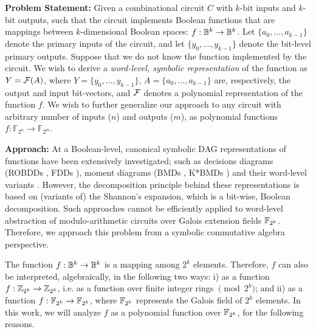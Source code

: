 {\bf Problem Statement:} Given a combinational circuit $C$ with
$k$-bit inputs and $k$-bit outputs, such that the circuit implements 
Boolean functions that are mappings between $k$-dimensional Boolean
spaces: $f: {\mathbb{B}}^k \rightarrow {\mathbb{B}}^k$. Let $\{a_0, \dots, a_{k-1}\}$
denote the primary inputs of the circuit, and let $\{y_0, \dots,
y_{k-1}\}$ denote the bit-level primary outputs. Suppose that we do
not know the function implemented by the circuit. We wish to
derive a {\it word-level, symbolic representation} of the function as
$Y = {\mathcal{F}}(A)$, where $Y = \{y_0, \dots, y_{k-1}\}$, $A = \{a_0, \dots, 
a_{k-1}\}$ are, respectively, the output and input bit-vectors,
and ${\mathcal{F}}$ denotes a polynomial representation of the
function $f$. We wish to further generalize our approach to any
circuit with arbitrary number  of inputs ($n$) and outputs ($m$), as
polynomial functions $f: {\mathbb{F}}_{2^n} \rightarrow
{\mathbb{F}}_{2^m}$. 

{\bf Approach:} At a Boolean-level, canonical symbolic DAG
representations of functions have been extensively investigated; such
as decisions diagrams (ROBDDs \cite{BRYA86}, FDDs \cite{okfdd}),
moment diagrams (BMDs \cite{bmd}, K*BMDs \cite{kbmd}) and their
word-level variants \cite{WLS}. However, the decomposition principle
behind these representations is based on (variants of) the Shannon's
expansion, which is a bit-wise, Boolean decomposition. Such
approaches cannot be efficiently applied to word-level abstraction of
modulo-arithmetic circuits over Galois extension fields
${\mathbb{F}}_{2^k}$. Therefore, we approach this problem from a symbolic commutative
algebra perspective. 


The function $f: {\mathbb{B}}^k \rightarrow {\mathbb{B}}^k$ is a
mapping among $2^k$ elements. Therefore, $f$ can also be interpreted,
algebraically, in the following two ways: i) as a function $f:
{\mathbb{Z}}_{2^k} \rightarrow {\mathbb{Z}}_{2^k}$, i.e. as a function over finite integer
rings $\pmod{ 2^k}$; and ii) as a function $f: {\mathbb{F}}_{2^k} \rightarrow {\mathbb{F}}_{2^k}$,
where ${\mathbb{F}}_{2^k}$ represents the Galois field of $2^k$
elements. In this work, we will analyze $f$ as a polynomial function
over ${\mathbb{F}}_{2^k}$, for the following reasons. 

